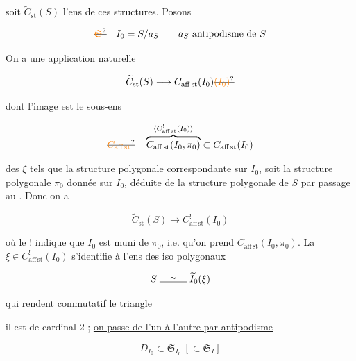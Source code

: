 soit $\widetilde C_{\mathrm{st}}(S)$ l'ens de ces structures. Posons

\[
\deleted{\unsure{\mathfrak S}}\quad I_0=S/a_S\qquad a_S\ \text{antipodisme de }S
\]

On a une application naturelle

\[
\widetilde C_{\mathrm{st}}(S)\longrightarrow C_{\mathrm{aff\,st}}(I_0)\deleted{\unsure{(I_0)}}
\]


dont l'image est le sous-ens

\[
\deleted{\unsure{C_{\mathrm{aff\,st}}}}\quad
\overbrace{C_{\mathrm{aff\,st}}(I_0,\pi_0)}^{\inserted{C_{\mathrm{aff\,st}}^{!}(I_0)}}\subset C_{\mathrm{aff\,st}}(I_0)
\]

 des $\xi$ tels que la structure polygonale correspondante sur $I_0$, soit la structure polygonale $\pi_0$ donnée sur $I_0$, déduite de la structure polygonale de $S$ par passage au . Donc on a

\[
\widetilde C_{\mathrm{st}}(S)\longrightarrow C_{\mathrm{aff\,st}}^{!}(I_0)
\]

où le ! indique que $I_0$ est muni de $\pi_0$, i.e. qu'on prend $C_{\mathrm{aff\,st}}(I_0,\pi_0)$. La   $\xi\in C_{\mathrm{aff\,st}}^{!}(I_0)$ s'identifie à l'ens des iso polygonaux

\[
S\mathrel{\overset{\sim}{\rule{2.8em}{0.4pt}}}\widetilde I_0(\xi)
\]

qui  rendent commutatif le triangle


il est de cardinal $2$ ; \uline{on passe de l'un à l'autre par antipodisme}


\[
D_{I_0}\subset\mathfrak S_{I_0}\ [\subset\mathfrak S_I]
\]

